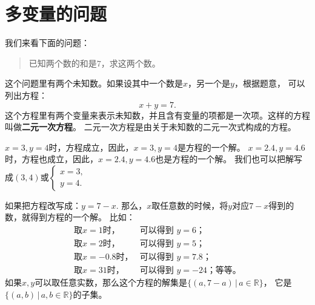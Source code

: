 \documentclass[12pt,UTF8]{ctexbook}
\begin{document}
\chapter{多变量的问题}
我们来看下面的问题：
\begin{quote}
    已知两个数的和是$7$，求这两个数。
\end{quote}
这个问题里有两个未知数。如果设其中一个数是$x$，另一个是$y$，根据题意，
可以列出方程：
$$ x + y = 7.$$
这个方程里有两个变量来表示未知数，并且含有变量的项都是一次项。这样的方程叫做\textbf{二元一次方程}。
二元一次方程是由关于未知数的二元一次式构成的方程。

$x=3, y=4$时，方程成立，因此，$x=3, y=4$是方程的一个解。
$x=2.4, y=4.6$时，方程也成立，因此，$x=2.4, y=4.6$也是方程的一个解。
我们也可以把解写成$(3, 4)$或$ \left\{ \begin{array}{c}
    x = 3, \\
    y = 4.
\end{array}\right.$

如果把方程改写成：$ y = 7 - x.$
那么，$x$取任意数的时候，将$y$对应$7 - x$得到的数，就得到方程的一个解。
比如：
$$
\begin{array}{ll}
    \mbox{取}x = 1\mbox{时，} & \mbox{可以得到 }y = 6\mbox{；} \\
    \mbox{取}x = 2\mbox{时，} & \mbox{可以得到 }y = 5\mbox{；}  \\
    \mbox{取}x = -0.8\mbox{时，} & \mbox{可以得到 }y = 7.8\mbox{；}  \\
    \mbox{取}x = 31\mbox{时，} & \mbox{可以得到 }y = -24\mbox{；等等。} 
\end{array}
$$
如果$x,y$可以取任意实数，那么这个方程的解集是$\{(a, 7-a) \,|\, a \in \mathbb{R}\}$，
它是$\{(a, b) \,|\, a,b\in\mathbb{R}\}$的子集。
\end{document}
